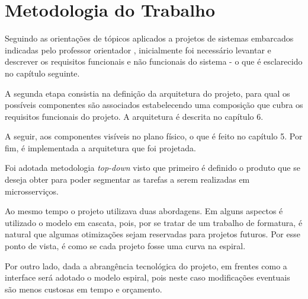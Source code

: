 \chapter{Metodologia do Trabalho}
Seguindo as orientações de tópicos aplicados a projetos de sistemas embarcados indicadas pelo professor orientador \cite{apostilaSE}, inicialmente foi necessário levantar e descrever os requisitos funcionais e não funcionais do sistema - o que é esclarecido no capítulo seguinte.

A segunda etapa consistia na definição da arquitetura do projeto, para qual os possíveis componentes são associados estabelecendo uma composição que cubra os requisitos funcionais do projeto. A arquitetura é descrita no capítulo 6.

A seguir, aos componentes visíveis no plano físico, o que é feito no capítulo 5. Por fim, é implementada a arquitetura que foi projetada.

Foi adotada metodologia \emph{top-down} visto que primeiro é definido o produto que se deseja obter para poder segmentar as tarefas a serem realizadas em microsserviços.

Ao mesmo tempo o projeto utilizava duas abordagens. Em alguns aspectos é utilizado o modelo em cascata, pois, por se tratar de um trabalho de formatura, é natural que algumas otimizações sejam reservadas para projetos futuros. Por esse ponto de vista, é como se cada projeto fosse uma curva na espiral.

Por outro lado, dada a abrangência tecnológica do projeto, em frentes como a interface será adotado o modelo espiral, pois neste caso modificações eventuais são menos custosas em tempo e orçamento.
